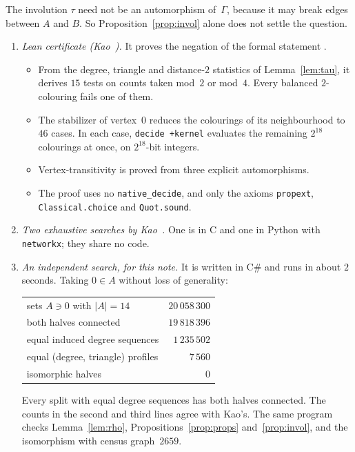 \documentclass[11pt,a4paper]{article}
\theoremstyle{definition}
\begin{document}
The involution $\tau$ need not be an automorphism of~$\Gamma$, because it may
break edges between $A$ and $B$. So Proposition~\ref{prop:invol} alone does not
settle the question.

\begin{enumerate}\itemsep2pt
\item[(i)] \emph{Lean certificate (Kao~\cite{LtS}).} It proves the negation of
  the formal statement .
  \begin{itemize}\itemsep0pt
  \item From the degree, triangle and distance-$2$ statistics of
    Lemma~\ref{lem:tau}, it derives $15$ tests on counts taken mod~$2$ or mod~$4$.
    Every balanced $2$-colouring fails one of them.
  \item The stabilizer of vertex~$0$ reduces the colourings of its neighbourhood
    to $46$ cases. In each case, \texttt{decide +kernel} evaluates the
    remaining $2^{18}$ colourings at once, on $2^{18}$-bit integers.
  \item Vertex-transitivity is proved from three explicit automorphisms.
  \item The proof uses no \texttt{native\_decide}, and only the axioms
    \texttt{propext}, \texttt{Classical.choice} and \texttt{Quot.sound}.
  \end{itemize}
\item[(ii)] \emph{Two exhaustive searches by Kao~\cite{K}.} One is in C and one
  in Python with \texttt{networkx}; they share no code.
\item[(iii)] \begin{minipage}[t]{\linewidth}
  \emph{An independent search, for this note.} It is written in C\#
  and runs in about $2$ seconds. Taking $0\in A$ without loss of generality:
  \begin{center}\small
  \begin{tabular}{lr}
  \hline
  sets $A\ni 0$ with $|A|=14$ & $20\,058\,300$\\
  \quad both halves connected & $19\,818\,396$\\
  \quad equal induced degree sequences & $1\,235\,502$\\
  \quad equal (degree, triangle) profiles & $7\,560$\\
  \quad isomorphic halves & $0$\\
  \hline
  \end{tabular}
  \end{center}
  Every split with equal degree sequences has both halves connected. The
  counts in the second and third lines agree with Kao's. The same program
  checks Lemma~\ref{lem:rho}, Propositions~\ref{prop:props}
  and~\ref{prop:invol}, and the isomorphism with census graph~$2659$.
  \end{minipage}
\end{enumerate}
\end{document}
